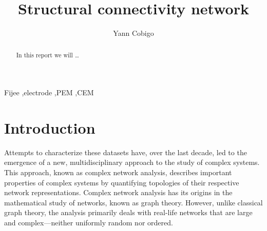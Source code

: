 \documentclass[final, paper=letter,5p,times,twocolumn]{elsarticle}
\begin{document}
\begin{frontmatter}

\title{Structural connectivity network}

\author[label1]{Yann Cobigo}
\address[label1]{University of California, San Francisco | ucsf.edu}




\begin{abstract}
In this report we will \dots
\end{abstract}

\begin{keyword}
Fijee \sep electrode \sep PEM \sep CEM
\end{keyword}

\end{frontmatter}


\section{Introduction}

Attempts to characterize these datasets have, over the last decade, led to the emergence of a new, multidisciplinary approach to the study of complex systems. This approach, known as complex network analysis, describes important properties of complex systems by quantifying topologies of their respective network representations. Complex network analysis has its origins in the mathematical study of networks, known as graph theory. However, unlike classical graph theory, the analysis primarily deals with real-life networks that are large and complex—neither uniformly random nor ordered.
\end{document}
